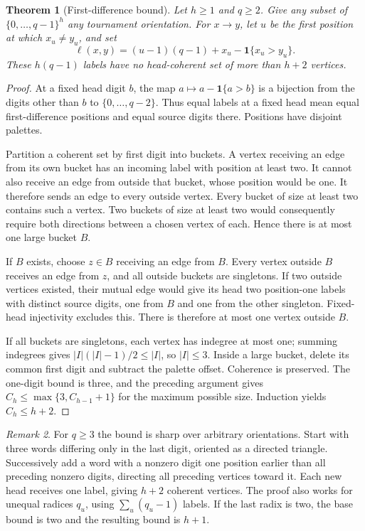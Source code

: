 \documentclass[11pt]{amsart}
\newtheorem{theorem}{Theorem}[section]
\theoremstyle{definition}
\theoremstyle{remark}
\newtheorem{remark}[theorem]{Remark}
\newcommand{\ind}{\mathbf1}
\begin{document}
\begin{theorem}[First-difference bound]\label{thm:digits}
Let $h\ge1$ and $q\ge2$. Give any subset of $\{0,\ldots,q-1\}^h$ any
tournament orientation. For $x\to y$, let $u$ be the first position at
which $x_u\ne y_u$, and set
\begin{equation}\label{eq:label}
 \ell(x,y)=(u-1)(q-1)+x_u-\ind\{x_u>y_u\}.
\end{equation}
These $h(q-1)$ labels have no head-coherent set of more than $h+2$ vertices.
\end{theorem}
\begin{proof}
At a fixed head digit $b$, the map $a\mapsto a-\ind\{a>b\}$ is a
bijection from the digits other than $b$ to $\{0,\ldots,q-2\}$.
Thus equal labels at a fixed head mean equal first-difference positions
and equal source digits there. Positions have disjoint palettes.

Partition a coherent set by first digit into buckets. A vertex receiving
an edge from its own bucket has an incoming label with position at least
two. It cannot also receive an edge from outside that bucket, whose
position would be one. It therefore sends an edge to every outside vertex.
Every bucket of size at least two contains such a vertex. Two buckets of
size at least two would consequently require both directions between a
chosen vertex of each. Hence there is at most one large bucket $B$.

If $B$ exists, choose $z\in B$ receiving an edge from $B$. Every vertex
outside $B$ receives an edge from $z$, and all outside buckets are singletons.
If two outside vertices existed, their mutual edge would give its head
two position-one labels with distinct source digits, one from $B$ and one
from the other singleton. Fixed-head injectivity excludes this. There is
therefore at most one vertex outside $B$.

If all buckets are singletons, each vertex has indegree at most one;
summing indegrees gives $|I|(|I|-1)/2\le|I|$, so $|I|\le3$.
Inside a large bucket, delete its common first digit and subtract the
palette offset. Coherence is preserved. The one-digit bound is three,
and the preceding argument gives $C_h\le\max\{3,C_{h-1}+1\}$ for the
maximum possible size. Induction yields $C_h\le h+2$.
\end{proof}

\begin{remark}\label{rem:sharp}
For $q\ge3$ the bound is sharp over arbitrary orientations. Start with
three words differing only in the last digit, oriented as a directed
triangle. Successively add a word with a nonzero digit one position
earlier than all preceding nonzero digits, directing all preceding
vertices toward it. Each new head receives one label, giving $h+2$
coherent vertices. The proof also works for unequal radices $q_u$,
using $\sum_u(q_u-1)$ labels. If the last radix is two, the base bound
is two and the resulting bound is $h+1$.
\end{remark}
\end{document}

